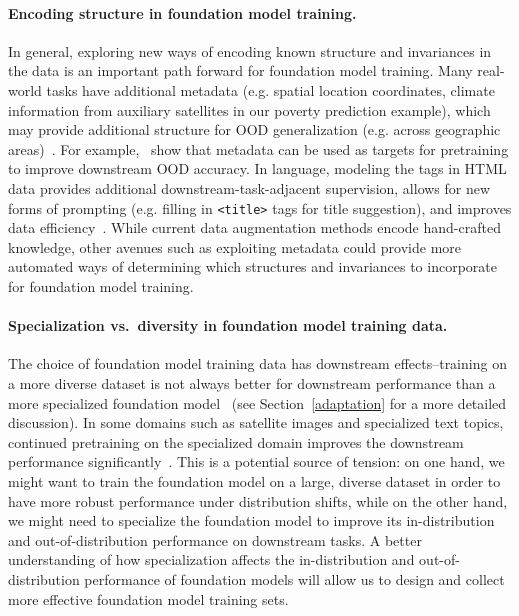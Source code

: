 \paragraph{Encoding structure in foundation model training.} In general, exploring new ways of encoding known structure and invariances in the data is an important path forward for foundation model training. Many real-world tasks have additional metadata (e.g. spatial location coordinates, climate information from auxiliary satellites in our poverty prediction example), which may provide additional structure for OOD generalization (e.g. across geographic areas)~\citep{xie2021innout,koh2021wilds}. For example,~\citet{xie2021innout} show that metadata can be used as targets for pretraining to improve downstream OOD accuracy. In language, modeling the tags in HTML data provides additional downstream-task-adjacent supervision, allows for new forms of prompting (e.g. filling in \texttt{<title>} tags for title suggestion), and improves data efficiency~\citep{aghajanyan2021HTLM}. While current data augmentation methods encode hand-crafted knowledge, other avenues such as exploiting metadata could provide more automated ways of determining which structures and invariances to incorporate for foundation model training. 

\paragraph{Specialization vs.~diversity in foundation model training data.} The choice of foundation model training data has downstream effects--training on a more diverse dataset is not always better for downstream performance than a more specialized foundation model~\citep{cole2021contrastive,chalkidis2020legal} (see Section~\ref{adaptation} for a more detailed discussion). In some domains such as satellite images and specialized text topics, continued pretraining on the specialized domain improves the downstream performance significantly~\citep{reed2021selfsupervised,gururangan2020dont}. This is a potential source of tension: on one hand, we might want to train the foundation model on a large, diverse dataset in order to have more robust performance under distribution shifts, while on the other hand, we might need to specialize the foundation model to improve its in-distribution and out-of-distribution performance on downstream tasks. A better understanding of how specialization affects the in-distribution and out-of-distribution performance of foundation models will allow us to design and collect more effective foundation model training sets.

